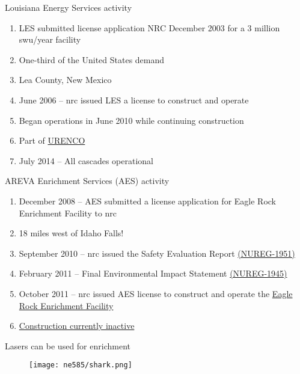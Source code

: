 \documentclass[aspectratio=1610,pdftex,dvipsnames,compress,xcolor={dvipsnames}]{beamer}
\newcommand{\acs}{\acrshort} %
\begin{document}
\begin{frame}{Louisiana Energy Services activity}
    \begin{enumerate}[topsep=0pt,itemsep=15pt,leftmargin=*,label=(\arabic*)]
        \item[]LES submitted license application NRC December 2003 for a 3 million \acs{swu}/year facility
        \item[]One-third of the United States demand
        \item[]Lea County, New Mexico
        \item[]June 2006 -- \acs{nrc} issued LES a license to construct and operate
        \item[]Began operations in June 2010 while continuing construction
        \item[]Part of \href{https://www.urenco.com/global-operations}{URENCO}
        \item[]July 2014 -- All cascades operational
    \end{enumerate}
\end{frame}


\begin{frame}{AREVA Enrichment Services (AES) activity}
    \begin{enumerate}[topsep=0pt,itemsep=15pt,leftmargin=*,label=(\arabic*)]
        \item[]December 2008 -- AES submitted a license application for Eagle Rock Enrichment Facility to \acs{nrc}
        \item[]18 miles west of Idaho Falls! 
        \item[]September 2010 -- \acs{nrc} issued the Safety Evaluation Report \href{https://www.nrc.gov/reading-rm/doc-collections/nuregs/staff/sr1951/index.html}{(NUREG-1951)}
        \item[]February 2011 -- Final Environmental Impact Statement \href{https://www.nrc.gov/reading-rm/doc-collections/nuregs/staff/sr1945/index.html}{(NUREG-1945)}
        \item[]October 2011 -- \acs{nrc} issued AES license to construct and operate the \href{http://www.new.areva.com/EN/operations-780/the-eagle-rock-enrichment-facility-enrichment-by-centrifugation.html}{Eagle Rock Enrichment Facility}
        \item[]\href{http://www.wise-uranium.org/epusarc.html}{Construction currently inactive}
    \end{enumerate}
\end{frame}


\begin{frame}{Lasers can be used for enrichment}
    \begin{figure}
        \centering
        \texttt{[image: ne585/shark.png]}
    \end{figure}
\end{frame}
\end{document}
